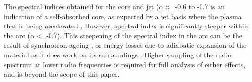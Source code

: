 \documentclass[fleqn,usenatbib]{mnras}
\begin{document}
{The spectral indices obtained for the core and jet ($\alpha \approx$ -0.6 to -0.7 is an indication of a self-absorbed core, as expected by a jet basis where the plasma that is being accelerated \citep{NWF01}. However, spectral index is significantly steeper within the arc ($\alpha <$ -0.7). This steepening of the spectral index in the arc can be the result of synchrotron ageing \citep{CPDL91}, or energy losses due to adiabatic expansion of the material as it does work on its surroundings \citep{CPDL91}. Higher sampling of the radio spectrum at lower radio frequencies is required for full analysis of either effects, and is beyond the scope of this paper.}

\begin{figure}
{\centering
{} \hspace{2em}

}
\end{figure}
\end{document}
